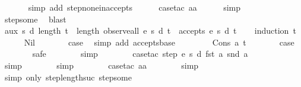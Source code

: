 \begin{isabellebody}
\ \ \ \ \ \isamarkupfalse%
\ {\isacharparenleft}simp\ add{\isacharcolon}\ step{\isacharunderscore}none{\isacharunderscore}inaccepts{\isacharparenright}\isanewline
\ \ \ \ \isamarkupfalse%
\ {\isacharparenleft}case{\isacharunderscore}tac\ aa{\isacharparenright}\isanewline
\ \ \ \ \isamarkupfalse%
\ simp\isanewline
\ \ \ \ \isamarkupfalse%
\ step{\isacharunderscore}some\ \isamarkupfalse%
\ blast\isanewline
{}\isamarkupfalse%
%
\endisatagproof
{\isafoldproof}%
%
\isadelimproof
\isanewline
%
\endisadelimproof
\isanewline
\isanewline
{}\isamarkupfalse%
\ aux{}{\isacharcolon}\ {\isachardoublequoteopen}{\isasymforall}s\ d{\isachardot}\ {\isacharparenleft}length\ t\ {\isacharequal}\ length\ {\isacharparenleft}observe{\isacharunderscore}all\ e\ s\ d\ t{\isacharparenright}{\isacharparenright}\ {\isasymlongrightarrow}\ accepts\ e\ s\ d\ t{\isachardoublequoteclose}\isanewline
%
\isadelimproof
\ \ %
\endisadelimproof
%
\isatagproof
{}\isamarkupfalse%
\ {\isacharparenleft}induction\ t{\isacharparenright}\isanewline
\ \ \ \ \isamarkupfalse%
\ Nil\isanewline
\ \ \ \ \isamarkupfalse%
\ \isamarkupfalse%
\ {\isacharquery}case\ \isamarkupfalse%
\ {\isacharparenleft}simp\ add{\isacharcolon}\ accepts{\isachardot}base{\isacharparenright}\isanewline
\ \ \isamarkupfalse%
\isanewline
\ \ \ \ \isamarkupfalse%
\ {\isacharparenleft}Cons\ a\ t{\isacharparenright}\isanewline
\ \ \ \ \isamarkupfalse%
\ \isamarkupfalse%
\ {\isacharquery}case\isanewline
\ \ \ \ \ \ \isamarkupfalse%
\ safe\isanewline
\ \ \ \ \ \ \isamarkupfalse%
\ simp\isanewline
\ \ \ \ \ \ \isamarkupfalse%
\ {\isacharparenleft}case{\isacharunderscore}tac\ {\isachardoublequoteopen}step\ e\ s\ d\ {\isacharparenleft}fst\ a{\isacharparenright}\ {\isacharparenleft}snd\ a{\isacharparenright}{\isachardoublequoteclose}{\isacharparenright}\isanewline
\ \ \ \ \ \ \ \isamarkupfalse%
\ simp\isanewline
\ \ \ \ \ \ \isamarkupfalse%
\ simp\isanewline
\ \ \ \ \ \ \isamarkupfalse%
\ {\isacharparenleft}case{\isacharunderscore}tac\ aa{\isacharparenright}\isanewline
\ \ \ \ \ \ \isamarkupfalse%
\ simp\isanewline
\ \ \ \ \ \ \isamarkupfalse%
\ {\isacharparenleft}simp\ only{\isacharcolon}\ step{\isacharunderscore}length{\isacharunderscore}suc\ step{\isacharunderscore}some{\isacharparenright}\isanewline

\end{isabellebody}
